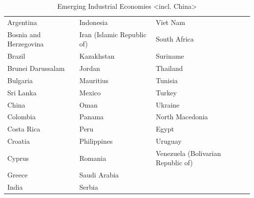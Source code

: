 \documentclass[
  openany, nofonts]{tufte-book}
\begin{document}
\begin{table}[!h]

\caption{\label{tab:c99-EIEtab}Emerging Industrial Economies <incl. China>}
\centering
\fontsize{10}{12}\selectfont
\begin{tabular}[t]{lll}
\toprule
Argentina & Indonesia & Viet Nam\\
Bosnia and Herzegovina & Iran (Islamic Republic of) & South Africa\\
Brazil & Kazakhstan & Suriname\\
Brunei Darussalam & Jordan & Thailand\\
Bulgaria & Mauritius & Tunisia\\
Sri Lanka & Mexico & Turkey\\
China & Oman & Ukraine\\
Colombia & Panama & North Macedonia\\
Costa Rica & Peru & Egypt\\
Croatia & Philippines & Uruguay\\
Cyprus & Romania & Venezuela (Bolivarian Republic of)\\
Greece & Saudi Arabia & \\
India & Serbia & \\
\bottomrule
\end{tabular}
\end{table}
\end{document}
